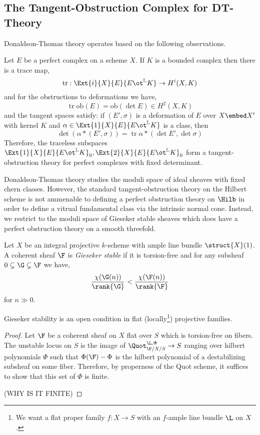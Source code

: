 \documentclass[12pt]{article}
\renewcommand{\tr}{\operatorname{tr}}
\newcommand{\LL}{\mathbb{L}}
\newcommand{\ob}{\mathrm{ob}}
\begin{document}
\subsection{The Tangent-Obstruction Complex for DT-Theory}

Donaldson-Thomas theory operates based on the following observations.

\begin{theorem}
Let $E$ be a perfect complex on a scheme $X$. If $K$ is a bounded complex then there is a trace map,
\[ \tr : \Ext{i}{X}{E}{E \ot^{\LL} K} \to H^i(X, K) \]
and for the obstructions to deformations we have,
\[ \tr \ob(E) = \ob(\det{E}) \in H^2(X, K) \]
and the tangent spaces satisfy: if $(E', \sigma)$ is a deformation of $E$ over $X \embed X'$ with kernel $K$ and $\alpha \in \Ext{1}{X}{E}{E \ot^{\LL} K}$ is a class, then
\[ \det{(\alpha * (E', \sigma))} = \tr{\alpha} * (\det{E'}, \det{\sigma}) \]
Therefore, the traceless subspaces $\Ext{1}{X}{E}{E \ot^{\LL} K}_0, \Ext{2}{X}{E}{E \ot^{\LL} K}_0$ form a tangent-obstruction theory for perfect complexes with fixed determinant. 
\end{theorem}

Donaldson-Thomas theory studies the moduli space of ideal sheaves with fixed chern classes. However, the standard tangent-obstruction theory on the Hilbert scheme is not ammenable to defining a perfect obstruction theory on $\Hilb$ in order to define a vitrual fundamental class via the intrinsic normal cone. Instead, we restrict to the moduli space of Gieseker stable sheaves which does have a perfect obstruction theory on a smooth threefold. 

\begin{defn}
Let $X$ be an integral projective $k$-scheme with ample line bundle $\struct{X}(1)$. A coherent sheaf $\F$ is \textit{Gieseker stable} if it is torsion-free and for any subsheaf $0 \subsetneq \G \subsetneq \F$ we have, 
\[ \frac{\chi(\G(n))}{\rank{\G}} < \frac{\chi(\F(n))}{\rank{\F}} \]
for $n \gg 0$.
\end{defn}

\begin{lemma}
Gieseker stability is an open condition in flat (locally\footnote{We want a flat proper family $f : X \to S$ with an $f$-ample line bundle $\L$ on $X$.}) projective families.
\end{lemma}

\begin{proof}
Let $\F$ be a coherent sheaf on $X$ flat over $S$ which is torsion-free on fibers. The unstable locus on $S$ is the image of $\Quot_{\F/X/S}^{\L, \Phi} \to S$ ranging over hilbert polynomials $\Phi$ such that $\Phi(\F) - \Phi$ is the hilbert polynomial of a destabilizing subsheaf on some fiber. Therefore, by properness of the Quot scheme, it suffices to show that this set of $\Phi$ is finite.  

(WHY IS IT FINITE)
\end{proof}
\end{document}

